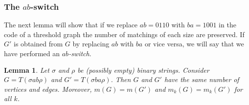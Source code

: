\documentclass[12pt]{amsart}
\theoremstyle{plain}
\newtheorem{lem}[thm]{Lemma}
\theoremstyle{definition}
\begin{document}
\subsubsection{The $ab$-switch}


The next lemma will show that if we replace $ab = 0110$ with $ba = 1001$ in the code of a threshold graph the number of matchings of each size are preserved.  If $G'$ is obtained from $G$ by replacing  $ab$ with  $ba$ or vice versa, we will say that we have performed an \emph{$ab$-switch}.




\begin{lem}  
\label{abmatchings} Let $\sigma$ and $\rho$ be (possibly empty) binary strings. Consider $G=T(\sigma a b\rho)$ and $G'=T(\sigma b a\rho)$.  Then $G$ and $G'$ have the same number of vertices and edges. Moreover, $m(G) = m(G')$ and $m_k(G) = m_k(G')$ for all $k$.
\end{lem}
\end{document}
